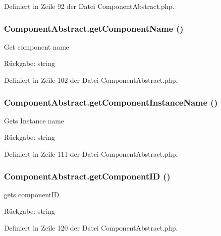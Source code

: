 Definiert in Zeile 92 der Datei ComponentAbstract.php.
\subsubsection{\setlength{\rightskip}{0pt plus 5cm}ComponentAbstract.getComponentName ()}\label{classComponentAbstract_54022cd983b1da389d452dc5e5f958ba}


Get component name

\begin{Desc}
\item[Rückgabe:]string \end{Desc}


Definiert in Zeile 102 der Datei ComponentAbstract.php.
\subsubsection{\setlength{\rightskip}{0pt plus 5cm}ComponentAbstract.getComponentInstanceName ()}\label{classComponentAbstract_f398fba12f1cc63c039e5f656251da57}


Gets Instance name

\begin{Desc}
\item[Rückgabe:]string \end{Desc}


Definiert in Zeile 111 der Datei ComponentAbstract.php.
\subsubsection{\setlength{\rightskip}{0pt plus 5cm}ComponentAbstract.getComponentID ()}\label{classComponentAbstract_e4e9d61703d858e0c5290d52fb57edd8}


gets componentID

\begin{Desc}
\item[Rückgabe:]string \end{Desc}


Definiert in Zeile 120 der Datei ComponentAbstract.php.

